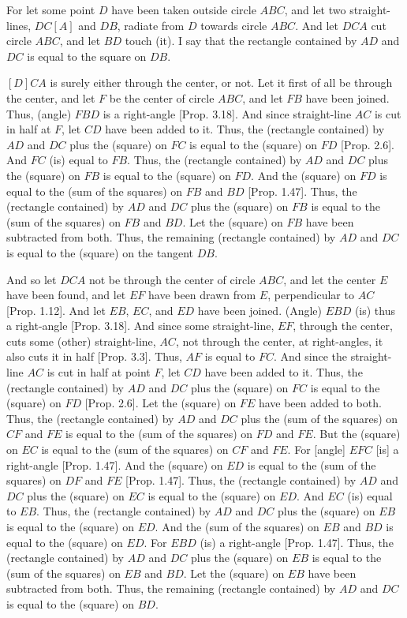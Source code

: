 \begin{Parallel}{}{}
{For let some point $D$ have been taken outside circle $ABC$, and let two
straight-lines, $DC[A]$ and $DB$, radiate from $D$ towards circle $ABC$. And
let $DCA$ cut circle $ABC$, and let $BD$ touch (it). I say that the rectangle
contained by $AD$ and $DC$ is equal to the square on $DB$.

$[D]CA$ is surely either through the center, or not. Let it first of all be
through the center, and let $F$ be the center of circle $ABC$, and let 
$FB$ have been joined. Thus, (angle) $FBD$ is a right-angle [Prop. 3.18].
And since straight-line $AC$ is cut in half at $F$, let $CD$ have been added to it.
Thus, the (rectangle contained) by $AD$ and $DC$ plus the (square) on $FC$ is
equal to the (square) on $FD$ [Prop. 2.6]. And $FC$ (is) equal to $FB$.
Thus, the (rectangle contained) by $AD$ and $DC$ plus the (square) on $FB$
is equal to the (square) on $FD$. And the (square) on $FD$ is equal to
the (sum of the squares) on $FB$ and $BD$ [Prop. 1.47]. Thus, the
(rectangle contained) by $AD$ and $DC$ plus the (square) on $FB$ is equal
to the (sum of the squares) on $FB$ and $BD$. Let the (square) on $FB$ have been subtracted
from both. Thus, the remaining (rectangle contained) by $AD$ and $DC$ 
is equal to the (square) on the tangent $DB$.

And so let $DCA$ not be through the center of circle $ABC$, and let the center $E$
have been found, and let $EF$ have been drawn from $E$, perpendicular to
$AC$ [Prop. 1.12]. And let $EB$, $EC$, and $ED$ have been joined. (Angle)
$EBD$ (is) thus a right-angle [Prop. 3.18]. And since some straight-line, $EF$, through the
center, cuts some (other) straight-line, $AC$, not through the center, at
right-angles, it also cuts it in half [Prop. 3.3]. Thus, $AF$ is equal to
$FC$. And since the straight-line $AC$ is cut in half at point $F$, let $CD$ have
been added to it. Thus, the (rectangle contained) by $AD$ and
 $DC$ plus the
(square) on $FC$ is equal to the (square) on $FD$ [Prop. 2.6]. Let
the (square) on $FE$ have been added to both. Thus, the (rectangle contained)
by $AD$ and $DC$ plus the (sum of the squares) on $CF$ and $FE$ is equal to
the (sum of the squares) on $FD$ and $FE$. But  the (square) on $EC$  is equal to the (sum of the squares)
on $CF$ and $FE$. For [angle] $EFC$ [is] a
right-angle [Prop. 1.47]. And the (square) on $ED$ is equal to the (sum of the squares) on $DF$ and
$FE$   [Prop. 1.47]. Thus, the (rectangle
contained) by $AD$ and $DC$ plus the (square) on $EC$ is equal to the (square)
on $ED$. And $EC$ (is) equal to $EB$. Thus, the (rectangle
contained) by $AD$ and $DC$ plus the (square) on $EB$ is equal to the (square)
on $ED$. And the (sum of the squares) on 
$EB$ and $BD$  is equal to  the (square) on $ED$. For $EBD$ (is) a right-angle [Prop. 1.47]. Thus, the (rectangle
contained) by $AD$ and $DC$ plus the (square) on $EB$ is equal to the (sum of the squares)
on $EB$ and $BD$. Let the (square) on $EB$ have been subtracted from both. Thus, the remaining
(rectangle contained) by $AD$ and $DC$ is equal to the (square) on $BD$.

}
\end{Parallel}
